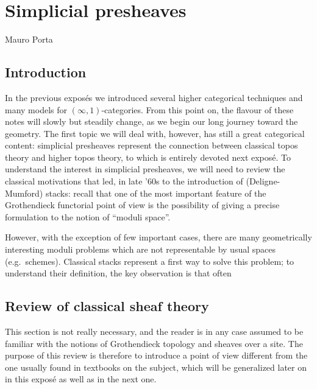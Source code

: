 \chapter{Simplicial presheaves}

\begin{flushright}
Mauro Porta
\end{flushright}

\begin{refsection}

\section{Introduction}

In the previous expos\'es we introduced several higher categorical techniques and many models for $(\infty,1)$-categories. From this point on, the flavour of these notes will slowly but steadily change, as we begin our long journey toward the geometry. The first topic we will deal with, however, has still a great categorical content: simplicial presheaves represent the connection between classical topos theory and higher topos theory, to which is entirely devoted next expos\'e. To understand the interest in simplicial presheaves, we will need to review the classical motivations that led, in late '60s to the introduction of (Deligne-Mumford) stacks: recall that one of the most important feature of the Grothendieck functorial point of view is the possibility of giving a precise formulation to the notion of ``moduli space''.

However, with the exception of few important cases, there are many geometrically interesting moduli problems which are not representable by usual spaces (e.g.\ schemes). Classical stacks represent a first way to solve this problem; to understand their definition, the key observation is that often 

\section{Review of classical sheaf theory}

This section is not really necessary, and the reader is in any case assumed to be familiar with the notions of Grothendieck topology and sheaves over a site. The purpose of this review is therefore to introduce a point of view different from the one usually found in textbooks on the subject, which will be generalized later on in this expos\'e as well as in the next one.


\end{refsection}
